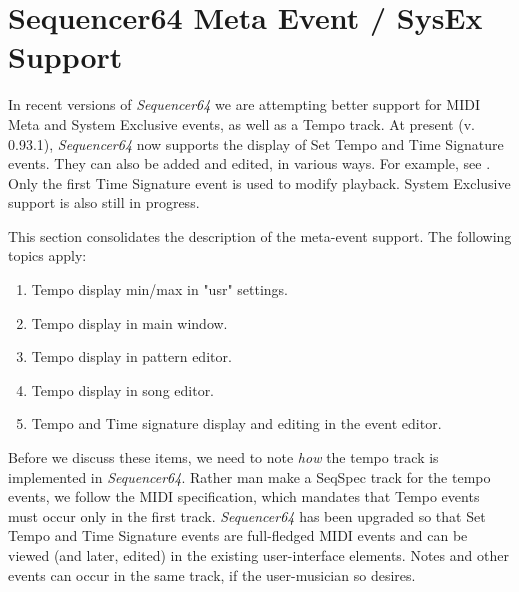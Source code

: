 %
%
%

\section{Sequencer64 Meta Event / SysEx Support}
\label{sec:meta_events}

   In recent versions of \textsl{Sequencer64} we are attempting better support
   for MIDI Meta and System Exclusive events, as well as a Tempo track.
   At present (v. 0.93.1), \textsl{Sequencer64} now supports the display of Set
   Tempo and Time Signature events.  They can also be added and edited, in
   various ways.  For example, see .
   Only the first Time Signature event is used to modify playback.
   System Exclusive support is also still in progress.

   This section consolidates the description of the meta-event support.
   The following topics apply:

   \begin{enumerate}
      \item Tempo display min/max in "usr" settings.
      \item Tempo display in main window.
      \item Tempo display in pattern editor.
      \item Tempo display in song editor.
      \item Tempo and Time signature display and editing in the event editor.
   \end{enumerate}

   Before we discuss these items, we need to note \textsl{how} the tempo track is
   implemented in \textsl{Sequencer64}.  Rather man make a SeqSpec track for
   the tempo events, we follow the MIDI specification, which mandates that
   Tempo events must occur only in the first track.  \textsl{Sequencer64} has
   been upgraded so that Set Tempo and Time Signature events are full-fledged
   MIDI events and can be viewed (and later, edited) in the existing
   user-interface elements.  Notes and other events can occur in the same
   track, if the user-musician so desires.

